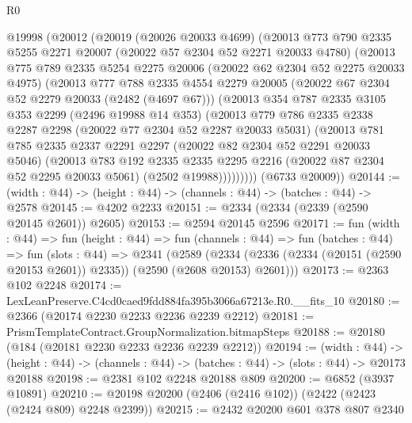 \begin{lexlean}{R0}
\begin{coremodule}
  @19998
    (@20012
      (@20019
        (@20026 @20033 @4699)
        (@20013
          @773
          @790
          @2335
          @5255
          @2271
          @20007
          (@20022 @57 @2304 @52 @2271 @20033 @4780)
          (@20013
            @775
            @789
            @2335
            @5254
            @2275
            @20006
            (@20022 @62 @2304 @52 @2275 @20033 @4975)
            (@20013
              @777
              @788
              @2335
              @4554
              @2279
              @20005
              (@20022 @67 @2304 @52 @2279 @20033 (@2482 (@4697 @67)))
              (@20013
                @354
                @787
                @2335
                @3105
                @353
                @2299
                (@2496 @19988 @14 @353)
                (@20013
                  @779
                  @786
                  @2335
                  @2338
                  @2287
                  @2298
                  (@20022 @77 @2304 @52 @2287 @20033 @5031)
                  (@20013
                    @781
                    @785
                    @2335
                    @2337
                    @2291
                    @2297
                    (@20022 @82 @2304 @52 @2291 @20033 @5046)
                    (@20013
                      @783
                      @192
                      @2335
                      @2335
                      @2295
                      @2216
                      (@20022 @87 @2304 @52 @2295 @20033 @5061)
                      (@2502 @19988)))))))))
      (@6733 @20009))
@20144 := (width : @44) -> (height : @44) -> (channels : @44) -> (batches : @44) -> @2578
@20145 := @4202 @2233
@20151 := @2334 (@2334 (@2339 (@2590 @20145 @2601)) @2605)
@20153 := @2594 @20145 @2596
@20171 := fun (width : @44) =>
  fun (height : @44) =>
  fun (channels : @44) =>
  fun (batches : @44) =>
  fun (slots : @44) =>
  @2341
    (@2589 (@2334 (@2336 (@2334 (@20151 (@2590 @20153 @2601)) @2335)) (@2590 (@2608 @20153) @2601)))
@20173 := @2363 @102 @2248
@20174 := LexLeanPreserve.C4cd0caed9fdd884fa395b3066a67213e.R0.__fits_10
@20180 := @2366 (@20174 @2230 @2233 @2236 @2239 @2212)
@20181 := PrismTemplateContract.GroupNormalization.bitmapSteps
@20188 := @20180 (@184 (@20181 @2230 @2233 @2236 @2239 @2212))
@20194 := (width : @44) ->
  (height : @44) -> (channels : @44) -> (batches : @44) -> (slots : @44) -> @20173 @20188
@20198 := @2381 @102 @2248 @20188 @809
@20200 := @6852 (@3937 @10891)
@20210 := @20198 @20200 (@2406 (@2416 @102)) (@2422 (@2423 (@2424 @809) @2248 @2399))
@20215 := @2432 @20200 @601 @378 @807 @2340

\end{coremodule}
\end{lexlean}
